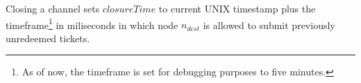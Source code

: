 Closing a channel sets $closureTime$ to current UNIX timestamp plus the timeframe\footnote{As of now, the timeframe is set for debugging purposes to five minutes.} in miliseconds in which node $n_{dest}$ is allowed to submit previously unredeemed tickets.

\begin{comment}
\paragraph{Opening a channel} Node $A$ can open a channel by transferring funds to the payment channels contract \textit{HoprChannels} and including the following \textit{userdata}:

$$[A: address, B: address, \lambda: uint8, \mu: uint8], \mu = 0,$$

where $\lambda$ is the amount to be staked by $A$. This call will trigger an on-chain event \textit{ChannelFunded} and open a unidirectional payment channel from $A$ to $B$. The payment channel will start in state \textit{Waiting for commitment}. The destination address of the payment channel must now set an on-chain commitment in order for the payment channel between both parties to become \textit{Open}. This is done by $B$ calling the \textit{bumpChannel()} function to make a new set of commitments towards this payment channel. This call will trigger an on-chain event \textit{ChannelOpened} and bumps the ticket epoch to ensure tickets with the previous epochs are invalidated. Every time the channel changes its state, an on-chain event \textit{ChannelUpdated} is emitted.

\paragraph{Redeeming tickets}
As long as the channel remains open, nodes can claim their incentives for forwarding packets via tickets. Tickets are redeemed by dispatching a \textit{redeemTicket()} call to an \textit{Open} payment channel.

If $B$ tries to redeem a ticket from the channel $A\rightarrow B$ (spending channel), but there is an open channel $B\rightarrow A$ (earning channel), $B$'s rewards will be transferred to $B\rightarrow A$ (earning channel). Otherwise, rewards will be sent directly to $B$.

\paragraph{Closing a channel}
Nodes can close a payment channel in order to access their previously staked funds. Only the payment channel creator can initiate the process by calling \textit{initiateChannelClosure()}. This changes the state to $Pending to close$ and triggers a grace period during which the destination node can redeem any unredeemed tickets. Nodes should actively monitor blockchain events to be aware of this payment channel state change.


\end{comment}
